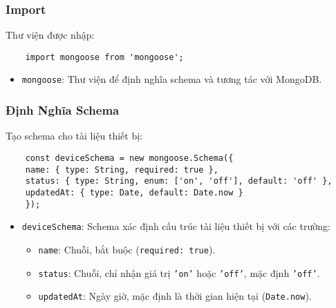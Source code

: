             \subsubsection{Import}
                \hspace*{0.6cm}Thư viện được nhập:
                \begin{lstlisting}
    import mongoose from 'mongoose';
                \end{lstlisting}
                \begin{itemize}
                    \item \texttt{mongoose}: Thư viện để định nghĩa schema và tương tác với MongoDB.
                \end{itemize}

            \subsubsection{Định Nghĩa Schema}
                \hspace*{0.6cm}Tạo schema cho tài liệu thiết bị:
                \begin{lstlisting}
    const deviceSchema = new mongoose.Schema({
    name: { type: String, required: true },
    status: { type: String, enum: ['on', 'off'], default: 'off' },
    updatedAt: { type: Date, default: Date.now }
    });
                \end{lstlisting}
                \begin{itemize}
                    \item \texttt{deviceSchema}: Schema xác định cấu trúc tài liệu thiết bị với các trường:
                    \begin{itemize}
                        \item \texttt{name}: Chuỗi, bắt buộc (\texttt{required: true}).
                        \item \texttt{status}: Chuỗi, chỉ nhận giá trị \texttt{'on'} hoặc \texttt{'off'}, mặc định \texttt{'off'}.
                        \item \texttt{updatedAt}: Ngày giờ, mặc định là thời gian hiện tại (\texttt{Date.now}).
                    \end{itemize}
                \end{itemize}

